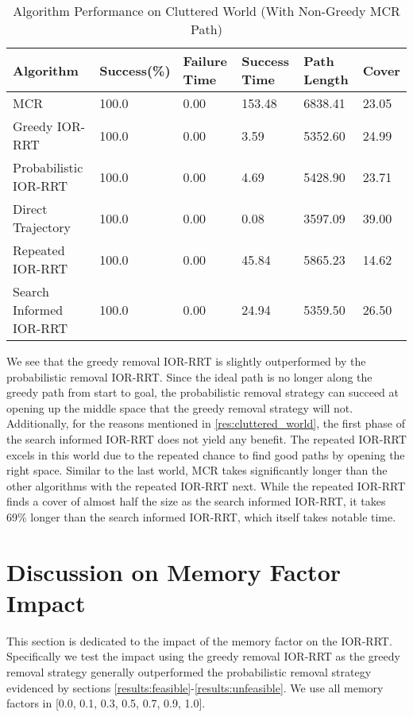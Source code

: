 \begin{table}[h!]
\centering
\begin{tabular}{@{}llllll@{}}
\toprule
Algorithm & Success(\%) & Failure Time & Success Time & Path Length & Cover \\
\midrule
MCR & 100.0 & 0.00 & 153.48 & 6838.41 & 23.05 \\
Greedy IOR-RRT & 100.0 & 0.00 & 3.59 & 5352.60 & 24.99 \\
Probabilistic IOR-RRT & 100.0 & 0.00 & 4.69 & 5428.90 & 23.71 \\
Direct Trajectory & 100.0 & 0.00 & 0.08 & 3597.09 & 39.00 \\
Repeated IOR-RRT & 100.0 & 0.00 & 45.84 & 5865.23 & 14.62 \\
Search Informed IOR-RRT & 100.0 & 0.00 & 24.94 & 5359.50 & 26.50 \\
\bottomrule
\end{tabular}
\caption{Algorithm Performance on Cluttered World (With Non-Greedy MCR Path)}
\label{tab:top_light_cluttered_world}
\end{table}

We see that the greedy removal IOR-RRT is slightly outperformed by the probabilistic removal IOR-RRT. Since the ideal path is no longer along the greedy path from start to goal, the probabilistic removal strategy can succeed at opening up the middle space that the greedy removal strategy will not. Additionally, for the reasons mentioned in \ref{res:cluttered_world}, the first phase of the search informed IOR-RRT does not yield any benefit. The repeated IOR-RRT excels in this world due to the repeated chance to find good paths by opening the right space. Similar to the last world, MCR takes significantly longer than the other algorithms with the repeated IOR-RRT next. While the repeated IOR-RRT finds a cover of almost half the size as the search informed IOR-RRT, it takes 69\% longer than the search informed IOR-RRT, which itself takes notable time. 

\section{Discussion on Memory Factor Impact}\label{results:memoryfactor}
This section is dedicated to the impact of the memory factor on the IOR-RRT. Specifically we test the impact using the greedy removal IOR-RRT as the greedy removal strategy generally outperformed the probabilistic removal strategy evidenced by sections \ref{results:feasible}-\ref{results:unfeasible}. We use all memory factors in [0.0, 0.1, 0.3, 0.5, 0.7, 0.9, 1.0].

